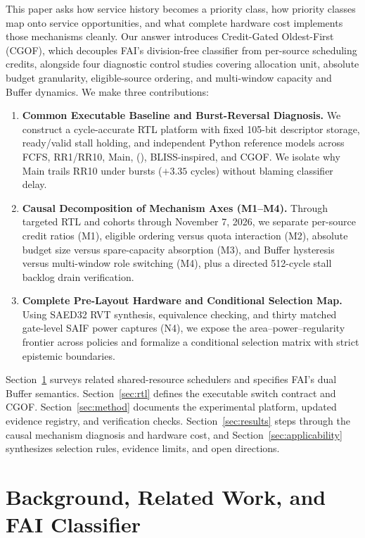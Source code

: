 This paper asks how service history becomes a priority class, how priority classes map onto service opportunities, and what complete hardware cost implements those mechanisms cleanly. Our answer introduces Credit-Gated Oldest-First (CGOF), which decouples FAI's division-free classifier from per-source scheduling credits, alongside four diagnostic control studies covering allocation unit, absolute budget granularity, eligible-source ordering, and multi-window capacity and Buffer dynamics. We make three contributions:

\begin{enumerate}
\item \textbf{Common Executable Baseline and Burst-Reversal Diagnosis.} We construct a cycle-accurate RTL platform with fixed 105-bit descriptor storage, ready/valid stall holding, and independent Python reference models across FCFS, RR1/RR10, Main, \Alg{} (), BLISS-inspired, and CGOF. We isolate why Main trails RR10 under bursts ($+3.35$ cycles) without blaming classifier delay.
\item \textbf{Causal Decomposition of Mechanism Axes (M1--M4).} Through targeted RTL and  cohorts through November 7, 2026, we separate per-source credit ratios (M1), eligible ordering versus quota interaction (M2), absolute budget size versus spare-capacity absorption (M3), and Buffer hysteresis versus multi-window role switching (M4), plus a directed 512-cycle stall backlog drain verification.
\item \textbf{Complete Pre-Layout Hardware and Conditional Selection Map.} Using SAED32 RVT synthesis, equivalence checking, and thirty matched gate-level SAIF power captures (N4), we expose the area--power--regularity frontier across policies and formalize a conditional selection matrix with strict epistemic boundaries.
\end{enumerate}

Section~\ref{sec:fai} surveys related shared-resource schedulers and specifies FAI's dual Buffer semantics. Section~\ref{sec:rtl} defines the executable switch contract and CGOF. Section~\ref{sec:method} documents the experimental platform, updated evidence registry, and verification checks. Section~\ref{sec:results} steps through the causal mechanism diagnosis and hardware cost, and Section~\ref{sec:applicability} synthesizes selection rules, evidence limits, and open directions.

\section{Background, Related Work, and FAI Classifier}
\label{sec:fai}

